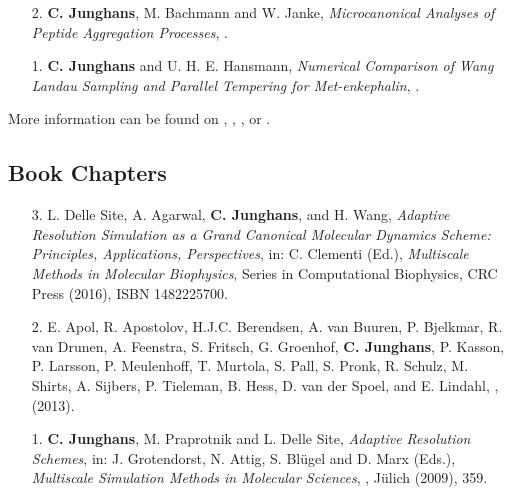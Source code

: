 \documentclass{article}
\begin{document}
\begin{enumerate}
\item[2.] \textbf{C. Junghans}, M. Bachmann and W. Janke,
  \textit{Microcanonical Analyses of Peptide Aggregation Processes},
  .

\item[1.] \textbf{C. Junghans} and U. H. E. Hansmann,
  \textit{Numerical Comparison of Wang Landau Sampling and Parallel Tempering for Met-enkephalin}, 
  .
\end{enumerate}

More information can be found on , , ,  or .

\subsection*{Book Chapters}

\begin{enumerate}
\item[3.] L. Delle Site, A. Agarwal, \textbf{C. Junghans}, and H. Wang, 
  \textit{Adaptive Resolution Simulation as a Grand Canonical Molecular Dynamics Scheme: Principles, Applications, Perspectives},
  in: C. Clementi (Ed.),
  \textit{Multiscale Methods in Molecular Biophysics},
  Series in Computational Biophysics, CRC Press (2016), ISBN 1482225700.

\item[2.] E. Apol, R. Apostolov, H.J.C. Berendsen, A. van Buuren, P. Bjelkmar, R. van Drunen, A. Feenstra, S. Fritsch, G. Groenhof, \textbf{C. Junghans}, P. Kasson, P. Larsson, P. Meulenhoff, T. Murtola, S. Pall, S. Pronk, R. Schulz, M. Shirts, A. Sijbers, P. Tieleman, B. Hess, D. van der Spoel, and E. Lindahl, 
  \textit{},
   (2013).

\item[1.] \textbf{C. Junghans}, M. Praprotnik and L. Delle Site,
  \textit{Adaptive Resolution Schemes},
  in: J. Grotendorst, N. Attig, S. Bl{\"u}gel and D. Marx (Eds.),
  \textit{Multiscale Simulation Methods in Molecular Sciences}, , J{\"u}lich (2009), 359.
\end{enumerate}
\end{document}
